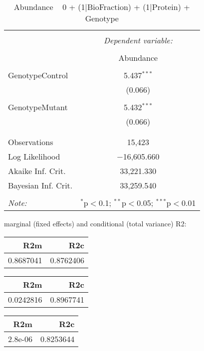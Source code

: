 \documentclass[11pt]{report}
\begin{document}
\begin{table}[!htbp] \centering 
  \caption{Abundance ~ 0 + (1|BioFraction) + (1|Protein) + Genotype} 
  \label{} 
\begin{tabular}{@{\extracolsep{5pt}}lc} 
\\[-1.8ex]\hline 
\hline \\[-1.8ex] 
 & \multicolumn{1}{c}{\textit{Dependent variable:}} \\ 
\cline{2-2} 
\\[-1.8ex] & Abundance \\ 
\hline \\[-1.8ex] 
 GenotypeControl & 5.437$^{***}$ \\ 
  & (0.066) \\ 
  & \\ 
 GenotypeMutant & 5.432$^{***}$ \\ 
  & (0.066) \\ 
  & \\ 
\hline \\[-1.8ex] 
Observations & 15,423 \\ 
Log Likelihood & $-$16,605.660 \\ 
Akaike Inf. Crit. & 33,221.330 \\ 
Bayesian Inf. Crit. & 33,259.540 \\ 
\hline 
\hline \\[-1.8ex] 
\textit{Note:}  & \multicolumn{1}{r}{$^{*}$p$<$0.1; $^{**}$p$<$0.05; $^{***}$p$<$0.01} \\ 
\end{tabular} 
\end{table} 
marginal (fixed effects) and conditional (total variance) R2:

\begin{tabular}{r|r}
\hline
R2m & R2c\\
\hline
0.8687041 & 0.8762406\\
\hline
\end{tabular}

\begin{tabular}{r|r}
\hline
R2m & R2c\\
\hline
0.0242816 & 0.8967741\\
\hline
\end{tabular}

\begin{tabular}{r|r}
\hline
R2m & R2c\\
\hline
2.8e-06 & 0.8253644\\
\hline
\end{tabular}
\end{document}
